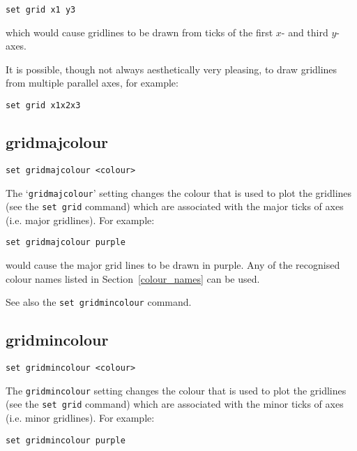 \documentclass[a4paper,onecolumn,11pt]{book}
\begin{document}
\begin{verbatim}
set grid x1 y3
\end{verbatim}

\noindent which would cause gridlines to be drawn from ticks of the first $x$- and third
$y$-axes.

It is possible, though not always aesthetically very pleasing, to draw
gridlines from multiple parallel axes, for example:

\begin{verbatim}
set grid x1x2x3
\end{verbatim}


\subsection{gridmajcolour}

\begin{verbatim}
set gridmajcolour <colour>
\end{verbatim}

The `{\tt gridmajcolour}' setting changes the colour that is used to plot the
gridlines (see the {\tt set grid} command) which are associated with the major
ticks of axes (i.e. major gridlines). For example:

\begin{verbatim}
set gridmajcolour purple
\end{verbatim}

\noindent would cause the major grid lines to be drawn in purple. Any of the recognised
colour names listed in Section~\ref{colour_names} can be used.

See also the {\tt set gridmincolour} command.


\subsection{gridmincolour}

\begin{verbatim}
set gridmincolour <colour>
\end{verbatim}

The {\tt gridmincolour} setting changes the colour that is used to plot the
gridlines (see the {\tt set grid} command) which are associated with the minor
ticks of axes (i.e. minor gridlines). For example:

\begin{verbatim}
set gridmincolour purple
\end{verbatim}
\end{document}
